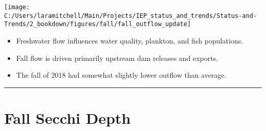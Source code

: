 \documentclass[
]{book}
\providecommand{\tightlist}{%
  \setlength{\itemsep}{0pt}\setlength{\parskip}{0pt}}
\begin{document}
\texttt{[image: C:/Users/laramitchell/Main/Projects/IEP\_status\_and\_trends/Status-and-Trends/2\_bookdown/figures/fall/fall\_outflow\_update]}

\begin{itemize}
\tightlist
\item
  Freshwater flow influences water quality, plankton, and fish populations.
\item
  Fall flow is driven primarily upstream dam releases and exports.
\item
  The fall of 2018 had somewhat slightly lower outflow than average.
\end{itemize}

\begin{center}\rule{0.5\linewidth}{0.5pt}\end{center}

\hypertarget{fall-secchi-depth}{%
\section{Fall Secchi Depth}\label{fall-secchi-depth}}
\end{document}

